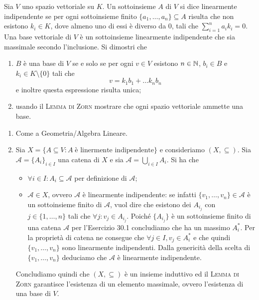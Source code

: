 \begin{es}
  Sia $ V $ uno spazio vettoriale su $ K $. Un sottoinsieme  $ A $ di $ V $ si dice linearmente indipendente se per ogni sottoinsieme finito $ \{a_1, \dots, a_n\} \subseteq A $ risulta che non esistono $ k_i \in K $, dove almeno uno di essi è diverso da 0, tali che $ \sum_{i = 1}^{n}a_i k_i = 0 $. Una base vettoriale di $ V $ è un sottoinsieme linearmente indipendente che sia massimale secondo l'inclusione. Si dimostri che
  \begin{enumerate}
  \item $ B $ è una base di $ V $ se e solo se per ogni $ v \in V $ esistono $ n \in \mathbb{N} $, $ b_i \in B $ e $ k_i \in K \setminus\{0\} $ tali che \[v = k_1 b_1 + \dots k_n b_n\] e inoltre questa espressione risulta unica;
  \item usando il \textsc{Lemma di Zorn} mostrare che ogni spazio vettoriale ammette una base.
  \end{enumerate}
\end{es}
\begin{enumerate}
\item Come a Geometria/Algebra Lineare.
\item Sia $ X = \{A \subseteq V : A \; \text{è linermente indipendente}\} $ e consideriamo $ (X, \subseteq) $. Sia $ \mathscr{A} = \{A_i\}_{i \in I} $ una catena di $ X $ e sia $ \mathcal{A} = \bigcup_{i \in I} A_i $. Si ha che
  \begin{itemize}
  \item $ \forall i \in I : A_i \subseteq \mathcal{A} $ per definizione di $ \mathcal{A} $;
  \item $ \mathcal{A} \in X $, ovvero $ \mathcal{A} $ è linearmente indipendente: se infatti $ \{v_1, \dots, v_n\} \in \mathcal{A} $ è un sottoinsieme finito di $ \mathcal{A} $, vuol dire che esistono dei $ A_{i_j} $ con $ j \in \{1, \dots, n\} $ tali che $ \forall j : v_j \in A_{i_j} $. Poiché $ \{A_{i_j}\} $ è un sottoinsieme finito di una catena $ \mathscr{A} $ per l'Esercizio 30.1 concludiamo che ha un massimo $ A_i^{*} $. Per la proprietà di catena ne consegue che $ \forall j \in I, v_j \in A_i^{*} $ e che quindi $ \{v_1, \dots, v_n\} $ sono linearmente indipendenti. Dalla genericità della scelta di $ \{v_1, \dots, v_n\} $ deduciamo che $ \mathcal{A} $ è linearmente indipendente.
  \end{itemize}
  Concludiamo quindi che $ (X, \subseteq) $ è un insieme induttivo ed il \textsc{Lemma di Zorn} garantisce l'esistenza di un elemento massimale, ovvero l'esistenza di una base di $ V $.
\end{enumerate}